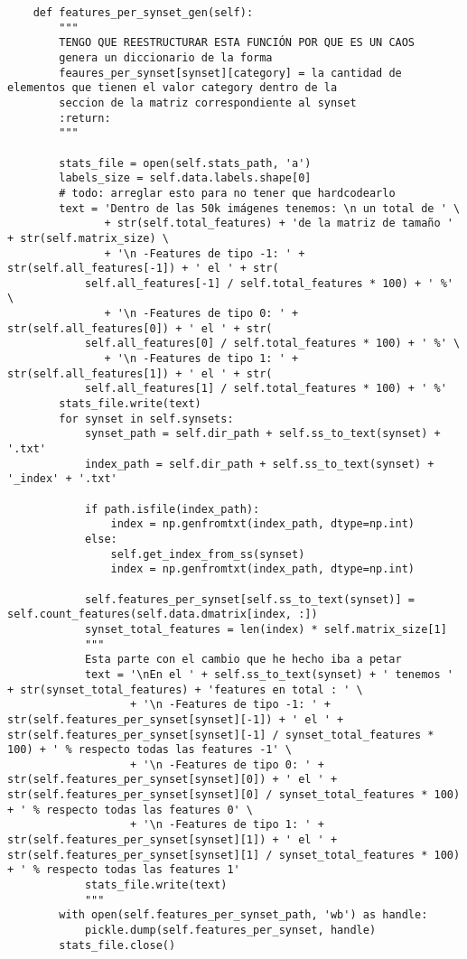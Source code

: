 \documentclass[12,twoside]{TFG-GM}
\theoremstyle{definition}
\theoremstyle{remark}
\begin{document}
\begin{verbatim}
    def features_per_synset_gen(self):
        """
        TENGO QUE REESTRUCTURAR ESTA FUNCIÓN POR QUE ES UN CAOS
        genera un diccionario de la forma
        feaures_per_synset[synset][category] = la cantidad de elementos que tienen el valor category dentro de la
        seccion de la matriz correspondiente al synset
        :return: 
        """

        stats_file = open(self.stats_path, 'a')
        labels_size = self.data.labels.shape[0]
        # todo: arreglar esto para no tener que hardcodearlo
        text = 'Dentro de las 50k imágenes tenemos: \n un total de ' \
               + str(self.total_features) + 'de la matriz de tamaño ' + str(self.matrix_size) \
               + '\n -Features de tipo -1: ' + str(self.all_features[-1]) + ' el ' + str(
            self.all_features[-1] / self.total_features * 100) + ' %' \
               + '\n -Features de tipo 0: ' + str(self.all_features[0]) + ' el ' + str(
            self.all_features[0] / self.total_features * 100) + ' %' \
               + '\n -Features de tipo 1: ' + str(self.all_features[1]) + ' el ' + str(
            self.all_features[1] / self.total_features * 100) + ' %'
        stats_file.write(text)
        for synset in self.synsets:
            synset_path = self.dir_path + self.ss_to_text(synset) + '.txt'
            index_path = self.dir_path + self.ss_to_text(synset) + '_index' + '.txt'

            if path.isfile(index_path):
                index = np.genfromtxt(index_path, dtype=np.int)
            else:
                self.get_index_from_ss(synset)
                index = np.genfromtxt(index_path, dtype=np.int)

            self.features_per_synset[self.ss_to_text(synset)] = self.count_features(self.data.dmatrix[index, :])
            synset_total_features = len(index) * self.matrix_size[1]
            """
            Esta parte con el cambio que he hecho iba a petar
            text = '\nEn el ' + self.ss_to_text(synset) + ' tenemos ' + str(synset_total_features) + 'features en total : ' \
                   + '\n -Features de tipo -1: ' + str(self.features_per_synset[synset][-1]) + ' el ' + str(self.features_per_synset[synset][-1] / synset_total_features * 100) + ' % respecto todas las features -1' \
                   + '\n -Features de tipo 0: ' + str(self.features_per_synset[synset][0]) + ' el ' + str(self.features_per_synset[synset][0] / synset_total_features * 100) + ' % respecto todas las features 0' \
                   + '\n -Features de tipo 1: ' + str(self.features_per_synset[synset][1]) + ' el ' + str(self.features_per_synset[synset][1] / synset_total_features * 100) + ' % respecto todas las features 1'
            stats_file.write(text)
            """
        with open(self.features_per_synset_path, 'wb') as handle:
            pickle.dump(self.features_per_synset, handle)
        stats_file.close()


\end{verbatim}
\end{document}
